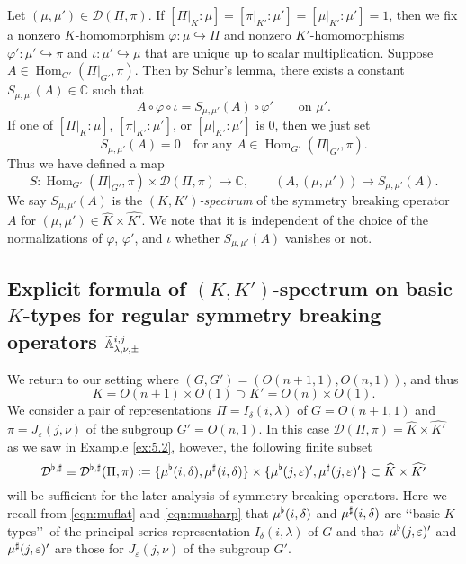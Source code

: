 \begin{definition}
[$(K,K')$-spectrum]
\label{def:KKspec}
Let $(\mu,\mu') \in {\mathcal{D}}(\Pi,\pi)$.  
If 
$[\Pi|_K:\mu]
=[\pi|_{K'}:\mu']
=[\mu|_{K'}:\mu']
=1$, 
 then we fix a nonzero $K$-homomorphism
 $\varphi:\mu \hookrightarrow \Pi$
 and nonzero $K'$-homomorphisms
 $\varphi':\mu' \hookrightarrow \pi$
 and $\iota:\mu' \hookrightarrow \mu$
 that are unique up to scalar multiplication.  
Suppose $A \in {\operatorname{Hom}}_{G'}(\Pi|_{G'}, \pi)$.  
Then by Schur's lemma,
 there exists a constant 
 $S_{\mu,\mu'}(A) \in {\mathbb{C}}$
 such that 
\begin{equation}
\label{eqn:Smumu}
A \circ \varphi \circ \iota
=
S_{\mu,\mu'}(A)\circ \varphi'
\qquad
\text{on $\mu'$}.  
\end{equation}
If one of $[\Pi|_K:\mu]$, 
 $[\pi|_{K'}:\mu']$,
 or $[\mu|_{K'}:\mu']$ is $0$, 
 then we just set
\[
   S_{\mu,\mu'}(A)=0
   \quad
   \text{for any }
   A \in   \operatorname{Hom}_{G'}(\Pi|_{G'}, \pi).  
\]
Thus we have defined a map
\begin{equation}
\label{eqn:KKspec}
 S \colon 
 \operatorname{Hom}_{G'}(\Pi|_{G'}, \pi)
 \times 
 {\mathcal{D}}(\Pi, \pi)
 \to {\mathbb{C}}, 
\qquad
(A, (\mu,\mu')) \mapsto S_{\mu,\mu'}(A).  
\end{equation}
We say $S_{\mu,\mu'}(A)$ is the {\it{$(K,K')$-spectrum}}
 of the symmetry breaking operator $A$
 for $(\mu,\mu') \in \widehat K \times \widehat {K'}$.  
We note that it is independent
 of the choice of the normalizations of $\varphi$, $\varphi'$, and $\iota$
 whether $S_{\mu,\mu'}(A)$ vanishes or not.  
\end{definition}

\subsection{Explicit formula of $(K,K')$-spectrum on basic $K$-types
 for regular symmetry breaking operators
 ${\widetilde{\mathbb{A}}}_{{\lambda},{\nu},{\pm}}^{{i,j}}$}
We return to our setting
 where $(G,G')=(O(n+1,1),O(n,1))$, 
 and thus
\[
K=O(n+1) \times O(1)
\supset
K'=O(n) \times O(1).  
\]
We consider a pair of representations
  $\Pi = I_{\delta}(i,\lambda)$
 of $G=O(n+1,1)$
 and $\pi=J_{\varepsilon}(j,\nu)$ of the subgroup $G'=O(n,1)$. 
In this case 
 ${\mathcal{D}}(\Pi,\pi)=\widehat K \times \widehat{K'}$
 as we saw in Example \ref{ex:5.2}, 
 however, 
 the following finite subset 
\[
   {\mathcal{D}}^{\flat, \sharp}
   \equiv
   {\mathcal{D}}^{\flat, \sharp}(\Pi,\pi)
   :=
   \{\mu^{\flat} (i,\delta), \mu^{\sharp} (i,\delta)\}
   \times
   \{\mu^{\flat} (j,\varepsilon)', \mu^{\sharp} (j,\varepsilon)'\}
   \subset \widehat K \times \widehat {K'}
\]
 will be sufficient for the later analysis of symmetry breaking operators.  
Here we recall from \eqref{eqn:muflat} and \eqref{eqn:musharp}
 that 
$\mu^{\flat} (i,\delta)$
 and 
$\mu^{\sharp} (i,\delta)$ are 
 \lq\lq{basic $K$-types}\rq\rq\ of the principal series representation
 $I_{\delta}(i,\lambda)$ of $G$
 and that $\mu^{\flat} (j,\varepsilon)'$ and $\mu^{\sharp}(j,\varepsilon)'$
 are those for $J_{\varepsilon}(j,\nu)$
 of the subgroup $G'$.  



